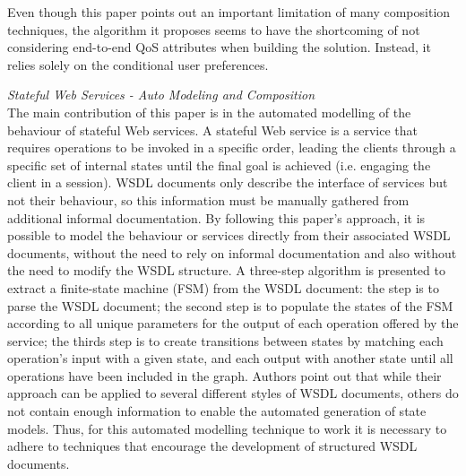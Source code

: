 Even though this paper points out an important limitation of many composition techniques, the algorithm it proposes
seems to have the shortcoming of not considering end-to-end QoS attributes when building the solution. Instead, it
relies solely on the conditional user preferences.

\textit{Stateful Web Services - Auto Modeling and Composition \cite{ali2013stateful}}\\
The main contribution of this paper is in the automated modelling of the behaviour of stateful Web services. A stateful Web service is a service
that requires operations to be invoked in a specific order, leading the clients through a specific set of internal states until the final goal
is achieved (i.e. engaging the client in a session). WSDL documents only describe the interface of services but not their behaviour, so this
information must be manually gathered from additional informal documentation. By following this paper's approach, it is possible to model the
behaviour or services directly from their associated WSDL documents, without the need to rely on informal documentation and also without the
need to modify the WSDL structure. A three-step algorithm is presented to extract a finite-state machine (FSM) from the WSDL document: the
step is to parse the WSDL document; the second step is to populate the states of the FSM according to all unique parameters for the output of each
operation offered by the service; the thirds step is to create transitions between states by matching each operation's input with a given state,
and each output with another state until all operations have been included in the graph. Authors point out that while their approach can be applied
to several different styles of WSDL documents, others do not contain enough information to enable the automated generation of state models. Thus,
for this automated modelling technique to work it is necessary to adhere to techniques that encourage the development of structured WSDL documents.

